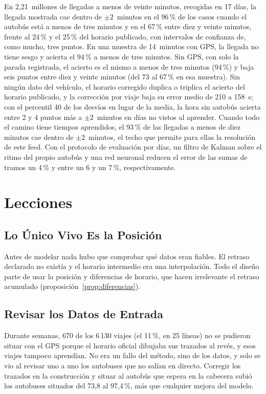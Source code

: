 En 2,21~millones de llegadas a menos de veinte minutos, recogidas en 17 días, la llegada mostrada cae dentro de $\pm2$~minutos
en el 96\,\% de los casos cuando el autobús está a menos de tres minutos y en el 67\,\% entre diez y veinte minutos,
frente al 24\,\% y el 25\,\% del horario publicado, con intervalos de confianza de, como mucho, tres puntos. En una muestra
de 14~minutos con GPS, la llegada no tiene sesgo y acierta el 94\,\% a menos de tres minutos. Sin GPS, con solo la
parada registrada, el acierto es el mismo a menos de tres minutos (94\,\%) y baja seis puntos entre diez y veinte
minutos (del 73 al 67\,\% en esa muestra). Sin ningún dato del
vehículo, el horario corregido duplica o triplica el acierto del horario publicado, y la corrección por viaje baja su
error medio de 210 a 158~s; con el percentil 40 de los desvíos en lugar de la media, la hora sin autobús acierta
entre 2 y 4 puntos más a $\pm2$~minutos en días no vistos al aprender. Cuando todo el camino tiene tiempos
aprendidos, el 93\,\% de las llegadas a menos de diez minutos cae dentro de $\pm2$~minutos, el techo que permite
para ellas la resolución de este feed. Con el protocolo de evaluación por días, un filtro de Kalman sobre el ritmo del propio autobús y
una red neuronal reducen el error de las sumas de tramos un 4\,\% y entre un 6 y un 7\,\%, respectivamente.

\section{Lecciones}

\subsection{Lo Único Vivo Es la Posición} Antes de modelar nada hubo que comprobar qué datos eran fiables. El retraso
declarado no existía y el horario intermedio era una interpolación. Todo el diseño parte de usar la posición y
diferencias de horario, que hacen irrelevante el retraso acumulado (proposición~\ref{prop:diferencias}).

\subsection{Revisar los Datos de Entrada} Durante semanas, 670 de los 6\,130 viajes (el 11\,\%, en 25 líneas) no se
pudieron situar con el GPS porque el horario oficial dibujaba sus trazados al revés, y esos viajes tampoco aprendían.
No era un fallo del método, sino de los datos, y solo se vio al revisar uno a uno los autobuses que no salían en
directo. Corregir los trazados en la construcción y situar al autobús que espera en la cabecera subió los autobuses
situados del 73{,}8 al 97{,}4\,\%, más que cualquier mejora del modelo.


